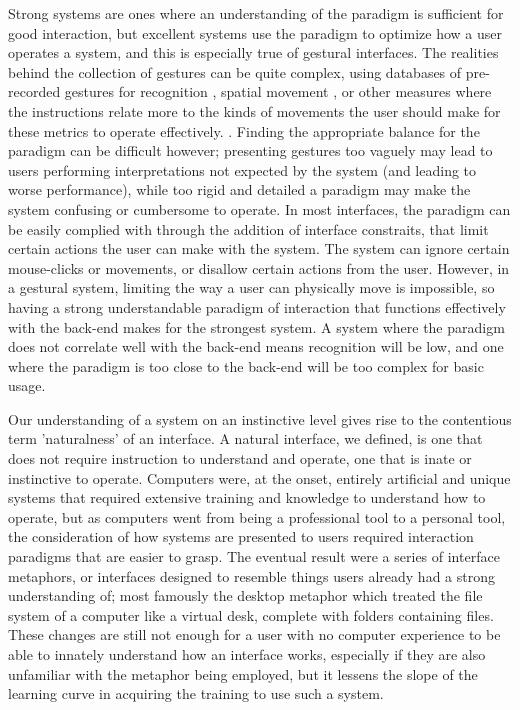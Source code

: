 Strong systems are ones where an understanding of the paradigm is sufficient for good interaction, but excellent systems use the paradigm to optimize how a user operates a system, and this is especially true of gestural interfaces. The realities behind the collection of gestures can be quite complex, using databases of pre-recorded gestures for recognition \cite{AthitsosEtAl2010}, spatial movement \cite{BaytasEtAl2014}, or other measures where the instructions relate more to the kinds of movements the user should make for these metrics to operate effectively. . Finding the appropriate balance for the paradigm can be difficult however; presenting gestures too vaguely may lead to users performing interpretations not expected by the system (and leading to worse performance), while too rigid and detailed a paradigm may make the system confusing or cumbersome to operate. In most interfaces, the paradigm can be easily complied with through the addition of interface constraits, that limit certain actions the user can make with the system. The system can ignore certain mouse-clicks or movements, or disallow certain actions from the user. However, in a gestural system, limiting the way a user can physically move is impossible, so having a strong understandable paradigm of interaction that functions effectively with the back-end makes for the strongest system. A system where the paradigm does not correlate well with the back-end means recognition will be low, and one where the paradigm is too close to the back-end will be too complex for basic usage.

Our understanding of a system on an instinctive level gives rise to the contentious term 'naturalness' of an interface. A natural interface, we defined, is one that does not require instruction to understand and operate, one that is inate or instinctive to operate. Computers were, at the onset, entirely artificial and unique systems that required extensive training and knowledge to understand how to operate, but as computers went from being a professional tool to a personal tool, the consideration of how systems are presented to users required interaction paradigms that are easier to grasp. The eventual result were a series of interface metaphors, or interfaces designed to resemble things users already had a strong understanding of; most famously the desktop metaphor which treated the file system of a computer like a virtual desk, complete with folders containing files. These changes are still not enough for a user with no computer experience to be able to innately understand how an interface works, especially if they are also unfamiliar with the metaphor being employed, but it lessens the slope of the learning curve in acquiring the training to use such a system.

